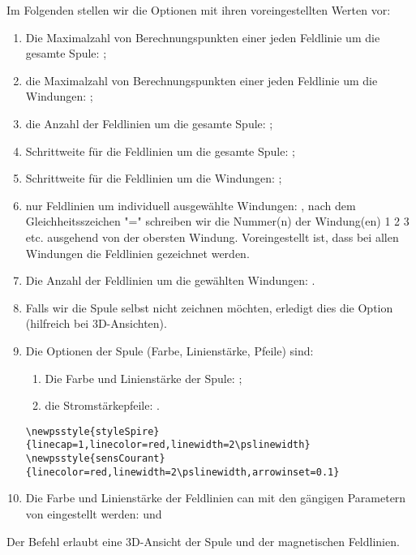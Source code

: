 \documentclass[11pt,english,BCOR10mm,DIV12,bibliography=totoc,parskip=false,smallheadings
    headexclude,footexclude,oneside]{pst-doc}
\begin{document}
Im Folgenden stellen wir die Optionen mit ihren voreingestellten Werten vor:
\begin{enumerate}
  \item Die Maximalzahl von Berechnungspunkten einer jeden Feldlinie um die gesamte Spule: ;
  \item die Maximalzahl von Berechnungspunkten einer jeden Feldlinie um die Windungen: ;
  \item die Anzahl der Feldlinien um die gesamte Spule: ;
  \item Schrittweite f\"{u}r die Feldlinien um die gesamte Spule: ;
  \item Schrittweite f\"{u}r die Feldlinien um die Windungen: ;
  \item nur Feldlinien um individuell ausgew\"{a}hlte Windungen: , nach dem Gleichheitsszeichen "=" schreiben wir die Nummer(n) der Windung(en) \textsf{1 2 3 etc.} ausgehend von der obersten Windung. Voreingestellt ist, dass bei allen Windungen die Feldlinien gezeichnet werden.
  \item Die Anzahl der Feldlinien um die gew\"{a}hlten Windungen: .
  \item Falls wir die Spule selbst nicht zeichnen m\"{o}chten, erledigt dies die Option  (hilfreich bei 3D-Ansichten).
  \item Die Optionen der Spule (Farbe, Linienst\"{a}rke, Pfeile) sind:
  \begin{enumerate}
        \item Die Farbe und Linienst\"{a}rke der Spule: ;
        \item die Stromst\"{a}rkepfeile: .
  \end{enumerate}
\begin{verbatim}
\newpsstyle{styleSpire}{linecap=1,linecolor=red,linewidth=2\pslinewidth}
\newpsstyle{sensCourant}{linecolor=red,linewidth=2\pslinewidth,arrowinset=0.1}
\end{verbatim}

 \item Die Farbe und Linienst\"{a}rke der Feldlinien can mit den g\"{a}ngigen Parametern von  eingestellt werden:  und  
\end{enumerate}

Der Befehl  erlaubt eine 3D-Ansicht der Spule und der magnetischen Feldlinien.
\end{document}
